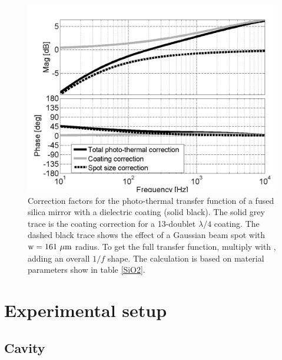 \begin{figure}[htp]
\includegraphics[width=\columnwidth]{figures/photothermal/FigOT1.png}%
\caption[Coating corrections]{Correction factors for the photo-thermal transfer function of a fused silica mirror with a dielectric coating (solid black). The solid grey trace is the coating correction for a 13-doublet $\lambda/4$  coating. The dashed black trace shows the effect of a Gaussian beam spot with ${\rm w}=161~\mu{\rm m}$ radius. To get the full transfer function, multiply with , adding an overall $1/f$ shape.
The calculation is based on material parameters show in table \ref{SiO2}. }%
\label{fig:PTcorr}%
\end{figure}

\section{Experimental setup}
\label{sec:exp}

\subsection{Cavity}


